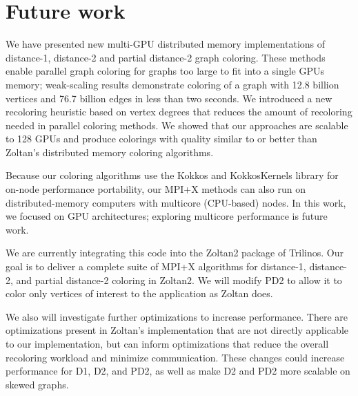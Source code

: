 \section{Future work}

We have presented new multi-GPU distributed memory implementations of distance-1, distance-2 and
partial distance-2 graph coloring.  These methods enable parallel graph coloring for graphs too large
to fit into a single GPUs memory; weak-scaling results demonstrate coloring of a graph with
12.8 billion vertices and 76.7 billion edges in less than two seconds.  
We introduced a new recoloring heuristic based on vertex degrees 
that reduces the amount of recoloring needed in parallel coloring methods.
We showed that our approaches are scalable to 128 GPUs and produce colorings with quality
similar to or better than Zoltan's distributed memory coloring algorithms.

Because our coloring algorithms use the Kokkos and KokkosKernels library for 
on-node performance portability, our MPI+X methods can also run on distributed-memory 
computers with multicore (CPU-based) nodes.
In this work, we focused on GPU architectures; exploring multicore performance 
is future work.

We are currently integrating this code into the Zoltan2 package of Trilinos.
Our goal is to deliver a complete suite of MPI+X algorithms for distance-1, distance-2, and partial distance-2 coloring in Zoltan2. 
We will modify PD2 to allow it to color only vertices of interest to the application as Zoltan does.


We also will investigate further optimizations to increase performance.
There are optimizations present in Zoltan's implementation that are not directly applicable to our implementation, but can inform optimizations that
reduce the overall recoloring workload and minimize communication.
These changes could increase performance for D1, D2, and PD2, 
as well as make D2 and PD2 more scalable on skewed graphs.



